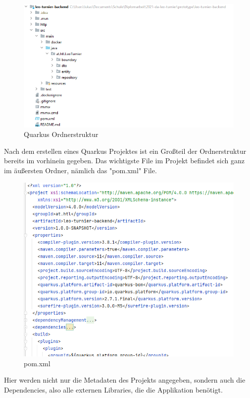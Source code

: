 \begin{figure}[H]
    \includegraphics[scale=0.8]{pics/quarkus_file_structure.png}
    \caption{Quarkus Ordnerstruktur}
\end{figure}

Nach dem erstellen eines Quarkus Projektes ist ein Großteil der Ordnerstruktur bereits im vorhinein gegeben. Das wichtigste File im Projekt befindet sich ganz im äußersten Ordner, nämlich das "pom.xml" File. 

\begin{figure}[H]
    \includegraphics[scale=0.6]{pics/pom.xml.png}
    \caption{pom.xml}
\end{figure}

Hier werden nicht nur die Metadaten des Projekts angegeben, sondern auch die Dependencies, also alle externen Libraries, die die Applikation benötigt. 

